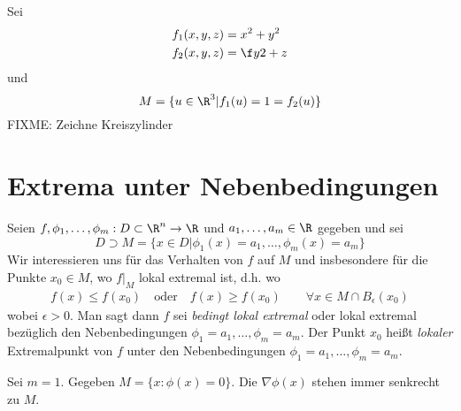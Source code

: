 \documentclass[a4paper,10pt]{scrbook}
\begin{document}
\begin{ex*}
	Sei
	\begin{align*}
		f_1(x,y,z) &= x^2 +y^2\\
		f_2(x,y,z) &= \f y2 + z
	\end{align*}
	und
	\[
		M=\{ u\in\R^3 | f_1(u) = 1 = f_2(u)\}
	\]
	FIXME: Zeichne Kreiszylinder
\end{ex*}


\section{Extrema unter Nebenbedingungen}


Seien $f,\phi_1,\dotsc, \phi_m : D\subset \R^n \to \R$ und $a_1,\dotsc,a_m\in \R$ gegeben und sei
\[
	D \supset M = \{x\in D| \phi_1(x) = a_1, \dotsc, \phi_m(x) = a_m\}
\]
Wir interessieren uns für das Verhalten von $f$ auf $M$ und insbesondere für die Punkte $x_0\in M$, wo $f\big|_M$ lokal extremal ist, d.h. wo
\begin{align*}
	f(x) \le f(x_0)\quad \text{oder}\quad f(x) \ge f(x_0)\qquad \forall x\in M\cap B_\epsilon(x_0)
\end{align*}
wobei $\epsilon > 0$.
Man sagt dann $f$ sei \emph{bedingt lokal extremal} oder lokal extremal bezüglich den Nebenbedingungen $\phi_1 = a_1, \dotsc, \phi_m=a_m$.
Der Punkt $x_0$ heißt \emph{lokaler} Extremalpunkt von $f$ unter den Nebenbedingungen $\phi_1=a_1,\dotsc, \phi_m=a_m$.

\begin{ex*}
	Sei $m=1$.
	Gegeben $M = \{x:\phi(x)=0\}$.
	Die $\nabla \phi(x)$ stehen immer senkrecht zu $M$.
	\fixme
\end{ex*}
\end{document}
